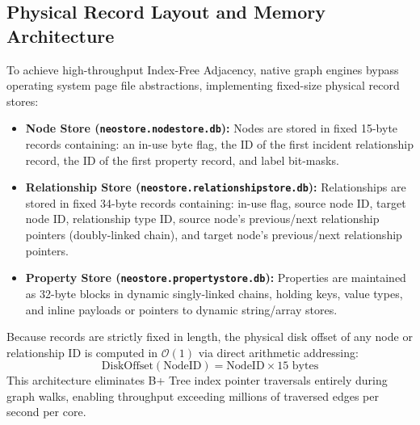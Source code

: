 \documentclass[10pt,twocolumn,letterpaper]{article}
\begin{document}
\subsection{Physical Record Layout and Memory Architecture}
To achieve high-throughput Index-Free Adjacency, native graph engines bypass operating system page file abstractions, implementing fixed-size physical record stores:
\begin{itemize}
    \item \textbf{Node Store (\texttt{neostore.nodestore.db}):} Nodes are stored in fixed 15-byte records containing: an in-use byte flag, the ID of the first incident relationship record, the ID of the first property record, and label bit-masks.
    \item \textbf{Relationship Store (\texttt{neostore.relationshipstore.db}):} Relationships are stored in fixed 34-byte records containing: in-use flag, source node ID, target node ID, relationship type ID, source node's previous/next relationship pointers (doubly-linked chain), and target node's previous/next relationship pointers.
    \item \textbf{Property Store (\texttt{neostore.propertystore.db}):} Properties are maintained as 32-byte blocks in dynamic singly-linked chains, holding keys, value types, and inline payloads or pointers to dynamic string/array stores.
\end{itemize}

Because records are strictly fixed in length, the physical disk offset of any node or relationship ID is computed in $\mathcal{O}(1)$ via direct arithmetic addressing:
\begin{equation}
\text{DiskOffset}(\text{NodeID}) = \text{NodeID} \times 15 \text{ bytes}
\end{equation}
This architecture eliminates B+ Tree index pointer traversals entirely during graph walks, enabling throughput exceeding millions of traversed edges per second per core.
\end{document}
